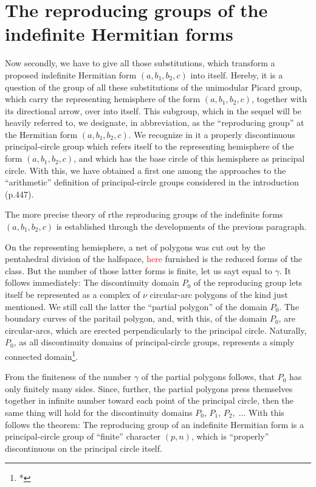 \section{The reproducing groups of the indefinite Hermitian forms}

Now secondly, we have to give all those substitutions, which transform a proposed indefinite Hermitian form $(a,b_1,b_2,c)$ into itself. Hereby, it is a question of the group of all these substitutions of the unimodular Picard group, which carry the representing hemisphere of the form $(a,b_1,b_2,c)$, together with its directional arrow, over into itself. This subgroup, which in the sequel will be heavily referred to, we designate, in abbreviation, as the “reproducing group” at the Hermitian form $(a,b_1,b_2,c)$. We recognize in it a properly discontinuous principal-circle group which refers itself to the representing hemisphere of the form $(a,b_1,b_2,c)$, and which has the base circle of this hemisphere as principal circle. With this, we have obtained a first one among the approaches to the “arithmetic” definition of principal-circle groups considered in the introduction (p.447).

The more precise theory of rthe reproducing groups of the indefinite forms $(a,b_1,b_2,c)$ is established through the developments of the previous paragraph.

On the representing hemisphere, a net of polygons was cut out by the pentahedral division of the halfspace, \textcolor{red}{here} furnished is the reduced forms of the class. But the number of those latter forms is finite, let us sayt equal to $\gamma$. It follows immediately: The discontinuity domain $P_0$ of the reproducing group lets itself be represented as a complex of $\nu$ circular-arc polygons of the kind just mentioned. We still call the latter the “partial polygon” of the domain $P_0$. The boundary curves of the paritail polygon, and, with this, of the domain $P_0$, are circular-arcs, which are erected perpendicularly to the principal circle. Naturally, $P_0$, as all discontinuity domains of principal-circle groups, represents a simply connected domain\footnote{*}.

From the finiteness of the number $\gamma$ of the partial polygons follows, that $P_0$ has only finitely many sides. Since, further, the partial polygons press themselves together in infinite number toward each point of the principal circle, then the same thing will hold for the discontinuity domains $P_0$, $P_1$, $P_2,\;\ldots$ With this follows the theorem: The reproducing group of an indefinite Hermitian form is a principal-circle group of “finite” character $(p,n)$, which is “properly” discontinuous on the principal circle itself.

